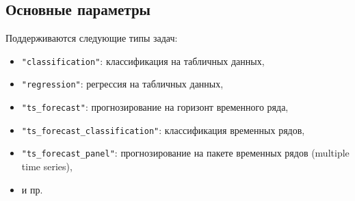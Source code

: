 \documentclass[%
	11pt,
	a4paper,
	utf8,
		]{article}
\begin{document}
\subsection{Основные параметры}

Поддерживаются следующие типы задач:
\begin{itemize}
	\item \verb|"classification"|: классификация на табличных данных,
	
	\item \verb|"regression"|: регрессия на табличных данных,
	
	\item \verb|"ts_forecast"|: прогнозирование на горизонт временного ряда,
	
	\item \verb|"ts_forecast_classification"|: классификация временных рядов,
	
	\item \verb|"ts_forecast_panel"|: прогнозирование на пакете временных рядов (multiple time series),
	
	\item и пр.
\end{itemize}
\end{document}
